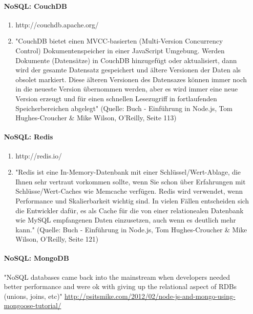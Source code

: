 


\paragraph{NoSQL: CouchDB}

\begin{enumerate}
\item http://couchdb.apache.org/
\item "CouchDB bietet einen MVCC-basierten (Multi-Version Concurrency Control) Dokumentenspeicher in einer JavaScript Umgebung. Werden Dokumente (Datens\"atze) in CouchDB hinzugef\"ugt oder aktualisiert, dann wird der gesamte Datensatz gespeichert und \"altere Versionen der Daten als obsolet markiert. Diese \"alteren Versionen des Datensazes k\"onnen immer noch in die neueste Version \"ubernommen werden, aber es wird immer eine neue Version erzeugt und f\"ur einen schnellen Lesezugriff in fortlaufenden Speicherbereichen abgelegt" \cite{hughes2012einfuhrung} (Quelle: Buch - Einf\"uhrung in Node.js, Tom Hughes-Croucher \& Mike Wilson, O'Reilly, Seite 113)
\end{enumerate}

\paragraph{NoSQL: Redis}

\begin{enumerate}
\item http://redis.io/
\item "Redis ist eine In-Memory-Datenbank mit einer Schl\"ussel/Wert-Ablage, die Ihnen sehr vertraut vorkommen sollte, wenn Sie schon \"uber Erfahrungen mit Schl\"usse/Wert-Caches wie Memcache verf\"ugen. Redis wird verwendet, wenn Performance und Skalierbarkeit wichtig sind. In vielen F\"allen entscheiden sich die Entwickler daf\"ur, es als Cache f\"ur die von einer relationealen Datenbank wie MySQL empfangenen Daten einzusetzen, auch wenn es deutlich mehr kann." \cite{hughes2012einfuhrung} (Quelle: Buch - Einf\"uhrung in Node.js, Tom Hughes-Croucher \& Mike Wilson, O'Reilly, Seite 121)
\end{enumerate}





\paragraph{NoSQL: MongoDB}

"NoSQL databases came back into the mainstream when developers needed better performance and were ok with giving up the relational aspect of RDBs (unions, joins, etc)" \url{http://psitsmike.com/2012/02/node-js-and-mongo-using-mongoose-tutorial/}

